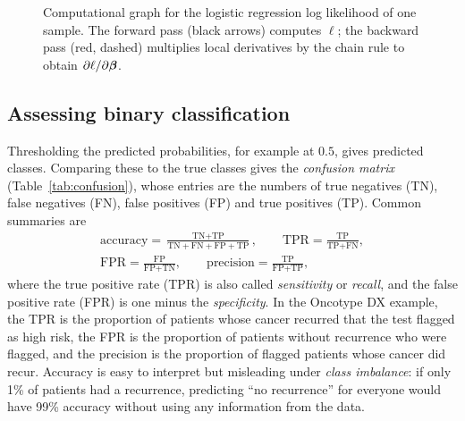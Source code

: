 \begin{figure}[t]
  \centering
  \caption{Computational graph for the logistic regression log likelihood of one sample. The forward pass (black arrows) computes $\ell$; the backward pass (red, dashed) multiplies local derivatives by the chain rule to obtain $\partial\ell/\partial\boldsymbol{\beta}$.}
  \label{fig:compgraph}
\end{figure}

\subsection{Assessing binary classification}
\label{sec:classification_metrics}

Thresholding the predicted probabilities, for example at $0.5$, gives predicted classes. Comparing these to the true classes gives the \emph{confusion matrix} (Table~\ref{tab:confusion}), whose entries are the numbers of true negatives (TN), false negatives (FN), false positives (FP) and true positives (TP). Common summaries are
\begin{gather}
  \text{accuracy} = \frac{\text{TN}+\text{TP}}{\text{TN}+\text{FN}+\text{FP}+\text{TP}}, \qquad
  \text{TPR} = \frac{\text{TP}}{\text{TP}+\text{FN}}, \nonumber\\
  \text{FPR} = \frac{\text{FP}}{\text{FP}+\text{TN}}, \qquad
  \text{precision} = \frac{\text{TP}}{\text{FP}+\text{TP}} ,
\end{gather}
where the true positive rate (TPR) is also called \emph{sensitivity} or \emph{recall}, and the false positive rate (FPR) is one minus the \emph{specificity}. In the Oncotype DX example, the TPR is the proportion of patients whose cancer recurred that the test flagged as high risk, the FPR is the proportion of patients without recurrence who were flagged, and the precision is the proportion of flagged patients whose cancer did recur. Accuracy is easy to interpret but misleading under \emph{class imbalance}: if only 1\% of patients had a recurrence, predicting ``no recurrence'' for everyone would have 99\% accuracy without using any information from the data.

